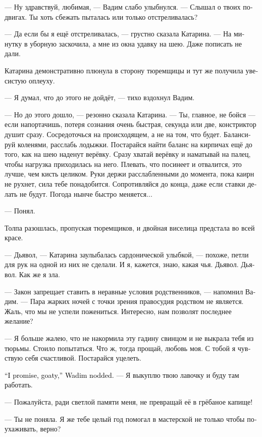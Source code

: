 \documentclass[a4paper,12pt,fleqn]{book}\usepackage{cooltooltips}\usepackage{polyglossia}\setdefaultlanguage[babelshorthands=true]{russian}\setotherlanguage{english}\defaultfontfeatures{Ligatures=TeX,Mapping=tex-text} \usepackage{xcolor}\definecolor{lightgray}{HTML}{bbbbbb}\color{lightgray}\newcommand{\ml}[3]{\textenglish{\textcolor{black}{#3}}}
\begin{document}
--- Ну здравствуй, любимая, --- Вадим слабо улыбнулся.
--- Слышал о твоих подвигах.
Ты хоть сбежать пыталась или только отстреливалась?

--- Да если бы я ещё отстреливалась, --- грустно сказала Катарина.
--- На минутку в уборную заскочила, а мне из окна удавку на шею.
Даже пописать не дали.

Катарина демонстративно плюнула в сторону тюремщицы и тут же получила увесистую оплеуху.

--- Я думал, что до этого не дойдёт, --- тихо вздохнул Вадим.

--- Но до этого дошло, --- резонно сказала Катарина.
--- Ты, главное, не бойся --- если напортачишь, потеря сознания очень быстрая, секунда или две, констриктор душит сразу.
Сосредоточься на происходящем, а не на том, что будет.
Балансируй коленями, расслабь лодыжки.
Постарайся найти баланс на кирпичах ещё до того, как на шею наденут верёвку.
Сразу хватай верёвку и наматывай на палец, чтобы нагрузка приходилась на него.
Плевать, что посинеет и отвалится, это лучше, чем кисть целиком.
Руки держи расслабленными до момента, пока каирн не рухнет, сила тебе понадобится.
Сопротивляйся до конца, даже если ставки делать не будут.
Погода нынче быстро меняется...

--- Понял.

Толпа разошлась, пропуская тюремщиков, и двойная виселица предстала во всей красе.

--- Дьявол, --- Катарина заулыбалась сардонической улыбкой, --- похоже, петли для рук на одной из них не сделали.
И я, кажется, знаю, какая чья.
Дьявол.
Дьявол.
Как же я зла.

--- Закон запрещает ставить в неравные условия родственников, --- напомнил Вадим.
--- Пара жарких ночей с точки зрения правосудия родством не является.
Жаль, что мы не успели пожениться.
Интересно, нам позволят последнее желание?

--- Я больше жалею, что не накормила эту гадину свинцом и не выкрала тебя из тюрьмы.
Стоило попытаться.
Что ж, тогда прощай, любовь моя.
С тобой я чувствую себя счастливой.
Постарайся уцелеть.

\ml{$0$}
{--- Обещаю, козонька, --- кивнул Вадим.}
{``I promise, goaty,'' Wadim nodded.}
--- Я выкуплю твою лавочку и буду там работать.

--- Пожалуйста, ради светлой памяти меня, не превращай её в грёбаное капище!

--- Ты не поняла.
Я же тебе целый год помогал в мастерской не только чтобы поухаживать, верно?
\end{document}
